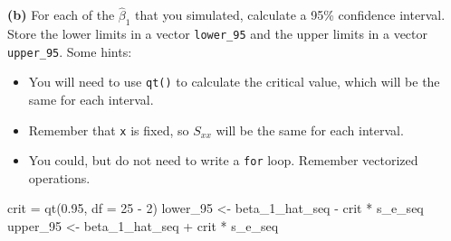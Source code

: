 \documentclass[
]{article}
\newenvironment{Shaded}{\begin{snugshade}}{\end{snugshade}}
\newcommand{\AttributeTok}[1]{\textcolor[rgb]{0.77,0.63,0.00}{#1}}
\newcommand{\ControlFlowTok}[1]{\textcolor[rgb]{0.13,0.29,0.53}{\textbf{#1}}}
\newcommand{\DecValTok}[1]{\textcolor[rgb]{0.00,0.00,0.81}{#1}}
\newcommand{\FloatTok}[1]{\textcolor[rgb]{0.00,0.00,0.81}{#1}}
\newcommand{\FunctionTok}[1]{\textcolor[rgb]{0.00,0.00,0.00}{#1}}
\newcommand{\NormalTok}[1]{#1}
\newcommand{\OtherTok}[1]{\textcolor[rgb]{0.56,0.35,0.01}{#1}}
\newcommand{\SpecialCharTok}[1]{\textcolor[rgb]{0.00,0.00,0.00}{#1}}
\newcommand{\StringTok}[1]{\textcolor[rgb]{0.31,0.60,0.02}{#1}}
\providecommand{\tightlist}{%
  \setlength{\itemsep}{0pt}\setlength{\parskip}{0pt}}
\begin{document}
\begin{Shaded}
\end{Shaded}

\textbf{(b)} For each of the \(\hat{\beta}_1\) that you simulated,
calculate a 95\% confidence interval. Store the lower limits in a vector
\texttt{lower\_95} and the upper limits in a vector \texttt{upper\_95}.
Some hints:

\begin{itemize}
\tightlist
\item
  You will need to use \texttt{qt()} to calculate the critical value,
  which will be the same for each interval.
\item
  Remember that \texttt{x} is fixed, so \(S_{xx}\) will be the same for
  each interval.
\item
  You could, but do not need to write a \texttt{for} loop. Remember
  vectorized operations.
\end{itemize}

\begin{Shaded}
\begin{Highlighting}[]
\NormalTok{crit }\OtherTok{=} \FunctionTok{qt}\NormalTok{(}\FloatTok{0.95}\NormalTok{, }\AttributeTok{df =} \DecValTok{25} \SpecialCharTok{{-}} \DecValTok{2}\NormalTok{)}
\NormalTok{lower\_95 }\OtherTok{\textless{}{-}}\NormalTok{ beta\_1\_hat\_seq }\SpecialCharTok{{-}}\NormalTok{ crit }\SpecialCharTok{*}\NormalTok{ s\_e\_seq}
\NormalTok{upper\_95 }\OtherTok{\textless{}{-}}\NormalTok{ beta\_1\_hat\_seq }\SpecialCharTok{+}\NormalTok{ crit }\SpecialCharTok{*}\NormalTok{ s\_e\_seq}
\end{Highlighting}
\end{Shaded}
\end{document}
